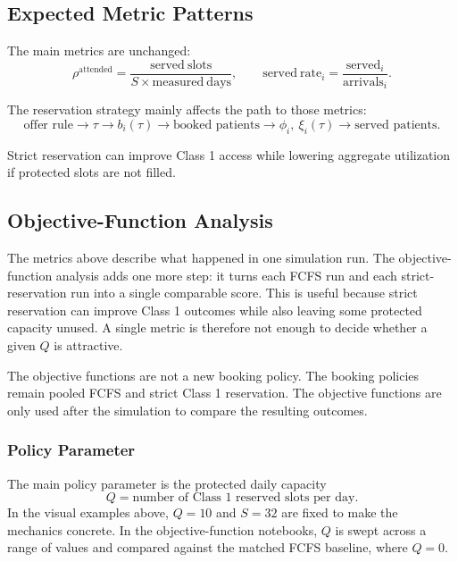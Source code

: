 \documentclass[11pt]{article}
\begin{document}
\subsection{Expected Metric Patterns}

The main metrics are unchanged:
\[
\rho^{\mathrm{attended}}
=
\frac{\mathrm{served\ slots}}{S\times\mathrm{measured\ days}},
\qquad
\mathrm{served\ rate}_i
=
\frac{\mathrm{served}_i}{\mathrm{arrivals}_i}.
\]

The reservation strategy mainly affects the path to those metrics:
\[
\text{offer rule}
\rightarrow
\tau
\rightarrow
b_i(\tau)
\rightarrow
\text{booked patients}
\rightarrow
\phi_i,\ \xi_i(\tau)
\rightarrow
\text{served patients}.
\]

\begin{keybox}[title={Interpretation of the Comparison}]
Strict reservation can improve Class 1 access while lowering aggregate utilization if protected
slots are not filled.
\end{keybox}

\subsection{Objective-Function Analysis}

The metrics above describe what happened in one simulation run. The objective-function analysis
adds one more step: it turns each FCFS run and each strict-reservation run into a single comparable
score. This is useful because strict reservation can improve Class 1 outcomes while also leaving
some protected capacity unused. A single metric is therefore not enough to decide whether a given
\(Q\) is attractive.

The objective functions are not a new booking policy. The booking policies remain pooled FCFS and
strict Class 1 reservation. The objective functions are only used after the simulation to compare
the resulting outcomes.

\subsubsection{Policy Parameter}

The main policy parameter is the protected daily capacity
\[
Q=\text{number of Class 1 reserved slots per day}.
\]
In the visual examples above, \(Q=10\) and \(S=32\) are fixed to make the mechanics concrete. In
the objective-function notebooks, \(Q\) is swept across a range of values and compared against the
matched FCFS baseline, where \(Q=0\).
\end{document}
